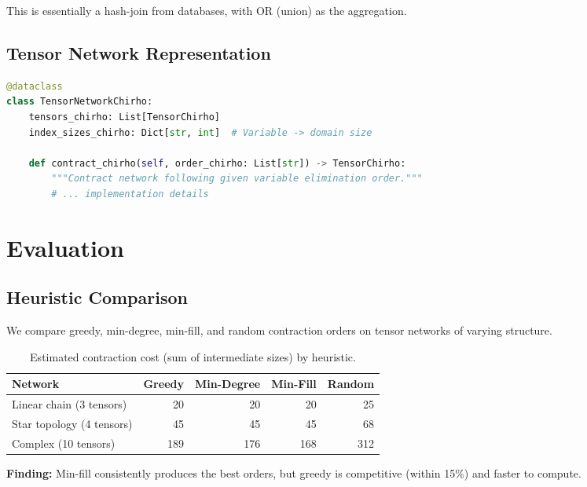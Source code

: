 \documentclass[11pt,a4paper]{article}
\begin{document}
This is essentially a hash-join from databases, with OR (union) as the aggregation.

\subsection{Tensor Network Representation}

\begin{lstlisting}[language=Python]
@dataclass
class TensorNetworkChirho:
    tensors_chirho: List[TensorChirho]
    index_sizes_chirho: Dict[str, int]  # Variable -> domain size

    def contract_chirho(self, order_chirho: List[str]) -> TensorChirho:
        """Contract network following given variable elimination order."""
        # ... implementation details
\end{lstlisting}

\section{Evaluation}
\label{sec:evaluation_chirho}

\subsection{Heuristic Comparison}

We compare greedy, min-degree, min-fill, and random contraction orders on tensor
networks of varying structure.

\begin{table}[ht]
\centering
\begin{tabular}{lrrrr}
\toprule
\textbf{Network} & \textbf{Greedy} & \textbf{Min-Degree} & \textbf{Min-Fill} & \textbf{Random} \\
\midrule
Linear chain (3 tensors) & 20 & 20 & 20 & 25 \\
Star topology (4 tensors) & 45 & 45 & 45 & 68 \\
Complex (10 tensors) & 189 & 176 & 168 & 312 \\
\bottomrule
\end{tabular}
\caption{Estimated contraction cost (sum of intermediate sizes) by heuristic.}
\label{tab:heuristics_chirho}
\end{table}

\textbf{Finding:} Min-fill consistently produces the best orders, but greedy
is competitive (within 15\%) and faster to compute.
\end{document}

